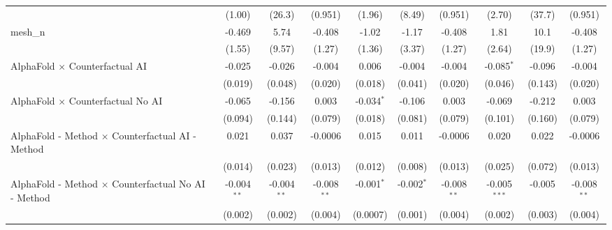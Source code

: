 \begin{tabular}{lccccccccc}
                                                               & (1.00)         & (26.3)        & (0.951)        & (1.96)         & (8.49)       & (0.951)        & (2.70)         & (37.7)        & (0.951)\\   
   mesh\_n                                                     & -0.469         & 5.74          & -0.408         & -1.02          & -1.17        & -0.408         & 1.81           & 10.1          & -0.408\\   
                                                               & (1.55)         & (9.57)        & (1.27)         & (1.36)         & (3.37)       & (1.27)         & (2.64)         & (19.9)        & (1.27)\\   
   AlphaFold $\times$ Counterfactual AI                        & -0.025         & -0.026        & -0.004         & 0.006          & -0.004       & -0.004         & -0.085$^{*}$   & -0.096        & -0.004\\   
                                                               & (0.019)        & (0.048)       & (0.020)        & (0.018)        & (0.041)      & (0.020)        & (0.046)        & (0.143)       & (0.020)\\   
   AlphaFold $\times$ Counterfactual No AI                     & -0.065         & -0.156        & 0.003          & -0.034$^{*}$   & -0.106       & 0.003          & -0.069         & -0.212        & 0.003\\   
                                                               & (0.094)        & (0.144)       & (0.079)        & (0.018)        & (0.081)      & (0.079)        & (0.101)        & (0.160)       & (0.079)\\   
   AlphaFold - Method $\times$ Counterfactual AI - Method      & 0.021          & 0.037         & -0.0006        & 0.015          & 0.011        & -0.0006        & 0.020          & 0.022         & -0.0006\\   
                                                               & (0.014)        & (0.023)       & (0.013)        & (0.012)        & (0.008)      & (0.013)        & (0.025)        & (0.072)       & (0.013)\\   
   AlphaFold - Method $\times$ Counterfactual No AI - Method   & -0.004$^{**}$  & -0.004$^{**}$ & -0.008$^{**}$  & -0.001$^{*}$   & -0.002$^{*}$ & -0.008$^{**}$  & -0.005$^{***}$ & -0.005        & -0.008$^{**}$\\   
                                                               & (0.002)        & (0.002)       & (0.004)        & (0.0007)       & (0.001)      & (0.004)        & (0.002)        & (0.003)       & (0.004)\\   

\end{tabular}
